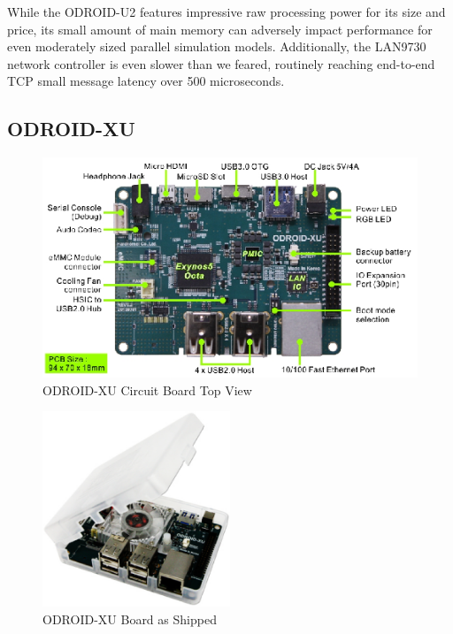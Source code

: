 \documentclass[11pt]{book}
\begin{document}
While the ODROID-U2 features impressive raw processing power for its size and
price, its small amount of main memory can adversely impact performance for even
moderately sized parallel simulation models. Additionally, the LAN9730 network
controller is even slower than we feared, routinely reaching end-to-end TCP
small message latency over 500 microseconds.


\subsection{\textbf{ODROID-XU}}

\begin{figure}[h]
\includegraphics[width=\textwidth]{odroid_xu_top}
\caption{ODROID-XU Circuit Board Top View \cite{odroid-xu-board-detail}}
\label{odroid-xu-board}
\end{figure}

\begin{figure}[h]
\centering
\includegraphics[width=0.5\textwidth]{odroid_xu}
\caption{ODROID-XU Board as Shipped \cite{odroid-xu-board-detail}}
\label{odroid-xu}
\end{figure}
\end{document}
